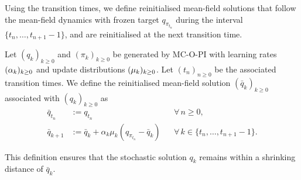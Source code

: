 Using the transition times, we define reinitialised mean-field solutions that follow the mean-field dynamics with frozen target $q_{\pi_{t_n}}$ during the interval $\{t_n, \dots, t_{n+1}-1\}$, and are reinitialised at the next transition time.

\begin{definition}
\label{def: reinitialised mean field}
Let $(q_k)_{k \ge 0}$ and $(\pi_k)_{k \ge 0}$ be generated by MC-O-PI with learning rates $(\alpha_k)_{k \ge 0}$ and update distributions $(\mu_k)_{k \ge 0}$.
Let $(t_n)_{n \ge 0}$ be the associated transition times.
We define the reinitialised mean-field solution $(\bar q_k)_{k\ge 0}$ associated with $(q_k)_{k \ge 0}$ as
\begin{subequations}
\label{eq: deterministic reinitialised mcopi}
\begin{align}
    \bar q_{t_n} &:= q_{t_n}  &&\forall \, n\ge 0,\\
    \bar q_{k+1} &:= \bar q_k + \alpha_k \mu_k ( q_{\pi_{t_n}} - \bar q_k)
    &&\forall \, k \in \{t_n,\dots,t_{n+1}-1\}.
\end{align}
\end{subequations}
\end{definition}
\vspace{-0.6cm}

This definition ensures that the stochastic solution $q_k$ remains within a shrinking distance of $\bar q_k$.

